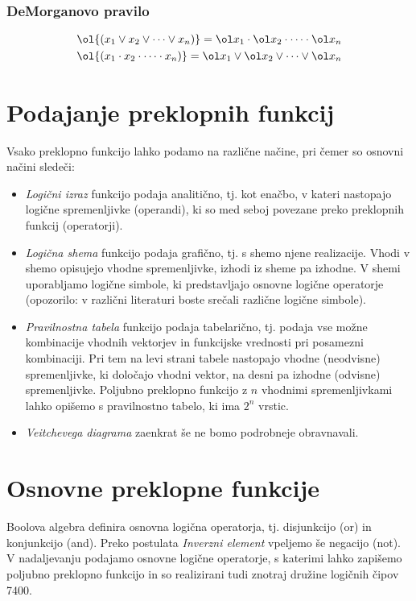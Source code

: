 \subsubsection*{DeMorganovo pravilo}
\begin{align*}
\ol{\left(x_1 \vee x_2 \vee \dots \vee x_n \right)} = \ol x_1 \cdot \ol x_2 \cdot \dots \cdot \ol x_n\\
\ol{\left(x_1 \cdot x_2 \cdot \dots \cdot x_n \right)} = \ol x_1 \vee \ol x_2 \vee \dots \vee \ol x_n
\end{align*}



\section{Podajanje preklopnih funkcij}
Vsako preklopno funkcijo lahko podamo na različne načine, pri čemer so osnovni načini sledeči:
\begin{itemize}
\item \emph{Logični izraz} funkcijo podaja analitično, tj. kot enačbo, v kateri nastopajo logične spremenljivke (operandi), ki so med seboj povezane preko preklopnih funkcij (operatorji).
\item \emph{Logična shema} funkcijo podaja grafično, tj.  s shemo njene realizacije. Vhodi v shemo opisujejo vhodne spremenljivke, izhodi iz sheme pa izhodne. V shemi uporabljamo logične simbole, ki predstavljajo osnovne logične operatorje (opozorilo: v različni literaturi boste srečali različne logične simbole).
\item \emph{Pravilnostna tabela} funkcijo podaja tabelarično, tj. podaja vse možne kombinacije vhodnih vektorjev in funkcijske vrednosti pri posamezni kombinaciji. Pri tem na levi strani tabele nastopajo vhodne (neodvisne) spremenljivke, ki določajo vhodni vektor, na desni pa izhodne (odvisne) spremenljivke. Poljubno preklopno funkcijo z $n$ vhodnimi spremenljivkami lahko opišemo s pravilnostno tabelo, ki ima $2^n$ vrstic.
\item \emph{Veitchevega diagrama} zaenkrat še ne bomo podrobneje obravnavali.
\end{itemize}

\section{Osnovne preklopne funkcije}
Boolova algebra definira osnovna logična operatorja, tj. disjunkcijo (or) in konjunkcijo (and). Preko postulata \emph{Inverzni element} vpeljemo še negacijo (not). V nadaljevanju podajamo osnovne logične operatorje, s katerimi lahko zapišemo poljubno preklopno funkcijo in so realizirani tudi znotraj družine logičnih čipov 7400. 

